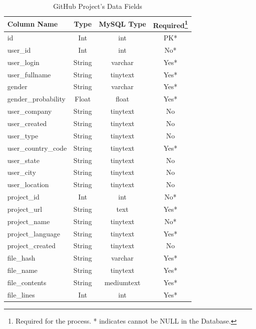 \documentclass{article}
\begin{document}
\begin{table}[t]
    \begin{center}
        \caption{GitHub Project's Data Fields}
        \label{tab:git_data}
        \begin{tabular}{|l | c | c | c |}
            \hline
            \textbf{Column Name} & \textbf{Type} & \textbf{MySQL Type} & \textbf{Required}\footnote{Required for the process. * indicates cannot be NULL in the Database.}\\
            \hline
            id & Int & int & PK*\\
            user{\_}id & Int & int & No*\\
            user{\_}login & String & varchar & Yes*\\
            user{\_}fullname & String & tinytext & Yes*\\
            gender & String & varchar & Yes*\\
            gender{\_}probability & Float & float & Yes*\\
            user{\_}company & String & tinytext & No\\
            user{\_}created & String & tinytext & No\\
            user{\_}type & String & tinytext & No\\
            user{\_}country{\_}code & String & tinytext & Yes*\\
            user{\_}state & String & tinytext & No\\
            user{\_}city & String & tinytext & No\\
            user{\_}location & String & tinytext & No\\
            \hline
            project{\_}id & Int & int & No*\\
            project{\_}url & String & text & Yes*\\
            project{\_}name & String & tinytext & No*\\
            project{\_}language & String & tinytext & Yes*\\
            project{\_}created & String & tinytext & No\\
            \hline
            file{\_}hash & String & varchar & Yes*\\
            file{\_}name & String & tinytext & Yes*\\
            file{\_}contents & String & mediumtext & Yes*\\
            file{\_}lines & Int & int & Yes*\\
            \hline
        \end{tabular}
    \end{center}
\end{table}
\end{document}
